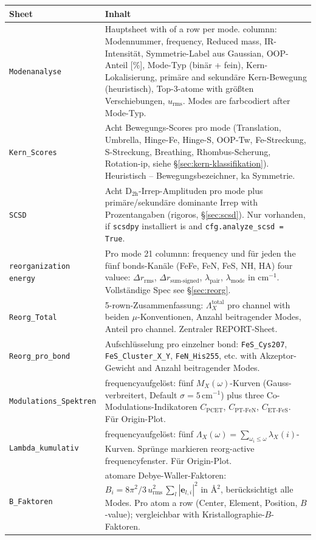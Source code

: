 \documentclass[11pt,a4paper,twoside]{article}
\newcommand{\evec}{\mathbf{e}}
\newcommand{\urms}{u_{\mathrm{rms}}}
\theoremstyle{remark}
\begin{document}
\begin{longtable}{p{} p{}}
\toprule
\textbf{Sheet} & \textbf{Inhalt} \\
\midrule
\endhead

\texttt{Modenanalyse} & Hauptsheet with of a row per mode. columnn:
  Modennummer, frequency, Reduced mass, IR-Intensit\"at,
  Symmetrie-Label aus Gaussian, OOP-Anteil [\%], Mode-Typ (bin\"ar +
  fein), Kern-Lokalisierung, prim\"are and sekund\"are Kern-Bewegung
  (heuristisch), Top-3-atome with gr\"o\ss ten Verschiebungen, $u_\text{rms}$.
  Modes are farbcodiert after Mode-Typ. \\

\texttt{Kern\_Scores} & Acht Bewegungs-Scores pro mode (Translation,
  Umbrella, Hinge-Fe, Hinge-S, OOP-Tw, Fe-Streckung, S-Streckung,
  Breathing, Rhombus-Scherung, Rotation-ip, siehe
  \S\ref{sec:kern-klassifikation}). Heuristisch -- Bewegungsbezeichner,
  ka Symmetrie. \\

\texttt{SCSD} & Acht D$_\mathrm{2h}$-Irrep-Amplituden pro mode plus
  prim\"are/sekund\"are dominante Irrep with Prozentangaben (rigoros,
  \S\ref{sec:scsd}). Nur vorhanden, if \texttt{scsdpy} installiert
  is and \texttt{cfg.analyze\_scsd = True}. \\

\texttt{reorganization energy} & Pro mode 21 columnn: frequency und
  f\"ur jeden the f\"unf bonds-Kan\"ale (FeFe, FeN, FeS, NH, HA)
  four valuee: $\Delta r_\text{rms}$, $\Delta r_\text{sum-signed}$,
  $\lambda_\text{pair}$, $\lambda_\text{mode}$ in cm$^{-1}$.
  Vollst\"andige Spec see \S\ref{sec:reorg}. \\

\texttt{Reorg\_Total} & 5-rown-Zusammenfassung:
  $\Lambda_X^\text{total}$ pro channel with beiden $\mu$-Konventionen,
  Anzahl beitragender Modes, Anteil pro channel. Zentraler REPORT-Sheet. \\

\texttt{Reorg\_pro\_bond} & Aufschl\"usselung pro einzelner
  bond: \texttt{FeS\_Cys207}, \texttt{FeS\_Cluster\_X\_Y},
  \texttt{FeN\_His255}, etc. with Akzeptor-Gewicht and Anzahl
  beitragender Modes. \\

\texttt{Modulations\_Spektren} & frequencyaufgel\"ost: f\"unf
  $M_X(\omega)$-Kurven (Gauss-verbreitert, Default $\sigma = 5$\,cm$^{-1}$)
  plus three Co-Modulations-Indikatoren $C_\text{PCET}$,
  $C_\text{PT-FeN}$, $C_\text{ET-FeS}$. F\"ur Origin-Plot. \\

\texttt{Lambda\_kumulativ} & frequencyaufgel\"ost: f\"unf
  $\Lambda_X(\omega) = \sum_{\omega_i \le \omega} \lambda_X(i)$-Kurven.
  Spr\"unge markieren reorg-active frequencyfenster. F\"ur Origin-Plot. \\

\texttt{B\_Faktoren} & atomare Debye-Waller-Faktoren: $B_i = 8\pi^2/3 \,
  \urms^2 \, \sum_l |\evec_{l,i}|^2$ in \AA{}$^2$, ber\"ucksichtigt alle
  Modes. Pro atom a row (Center, Element, Position, $B$-value);
  vergleichbar with Kristallographie-$B$-Faktoren. \\
\bottomrule
\end{longtable}
\end{document}

